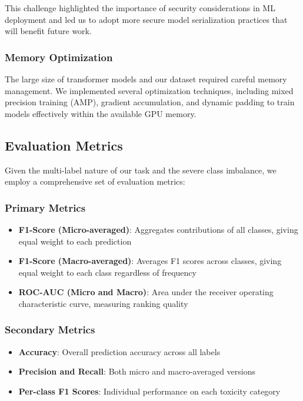 \documentclass[11pt]{article}
\begin{document}
This challenge highlighted the importance of security considerations in ML deployment and led us to adopt more secure model serialization practices that will benefit future work.

\subsubsection{Memory Optimization}

The large size of transformer models and our dataset required careful memory management. We implemented several optimization techniques, including mixed precision training (AMP), gradient accumulation, and dynamic padding to train models effectively within the available GPU memory.

\subsection{Evaluation Metrics}

Given the multi-label nature of our task and the severe class imbalance, we employ a comprehensive set of evaluation metrics:

\subsubsection{Primary Metrics}
\begin{itemize}
    \item \textbf{F1-Score (Micro-averaged)}: Aggregates contributions of all classes, giving equal weight to each prediction
    \item \textbf{F1-Score (Macro-averaged)}: Averages F1 scores across classes, giving equal weight to each class regardless of frequency
    \item \textbf{ROC-AUC (Micro and Macro)}: Area under the receiver operating characteristic curve, measuring ranking quality
\end{itemize}

\subsubsection{Secondary Metrics}
\begin{itemize}
    \item \textbf{Accuracy}: Overall prediction accuracy across all labels
    \item \textbf{Precision and Recall}: Both micro and macro-averaged versions
    \item \textbf{Per-class F1 Scores}: Individual performance on each toxicity category
\end{itemize}
\end{document}
